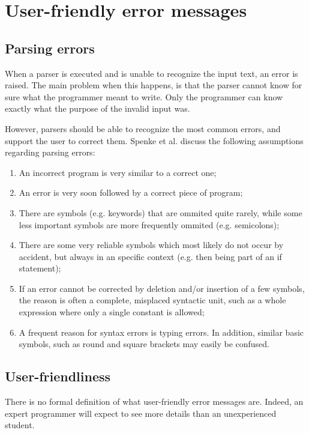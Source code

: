 
\section{User-friendly error messages}
\label{sec:errors}

\subsection{Parsing errors}
When a parser is executed and is unable to recognize the input text, an error is raised.
The main problem when this happens, is that the parser cannot know for sure what the programmer meant to write.
Only the programmer can know exactly what the purpose of the invalid input was.

However, parsers should be able to recognize the most common errors, and support the user to correct them.
Spenke et al.  discuss the following assumptions regarding parsing errors:
\begin{enumerate}
	\item An incorrect program is very similar to a correct one;
	\item An error is very soon followed by a correct piece of program;
	\item There are symbols (e.g. keywords) that are ommited quite rarely, while some less important symbols are more frequently ommited (e.g. semicolons);
	\item There are some very reliable symbols which most likely do not occur by accident, but always in an specific context (e.g. then being part of an if statement);
	\item  If an error cannot be corrected by deletion and/or insertion of a few symbols, the reason is often a complete, misplaced syntactic unit, such as a whole expression where only a single constant is allowed;
	\item A frequent reason for syntax errors is typing errors. In addition, similar basic symbols, such as round and square brackets may easily be confused.
\end{enumerate}

\subsection{User-friendliness}
There is no formal definition of what user-friendly error messages are.
Indeed, an expert programmer will expect to see more details than an unexperienced student.

